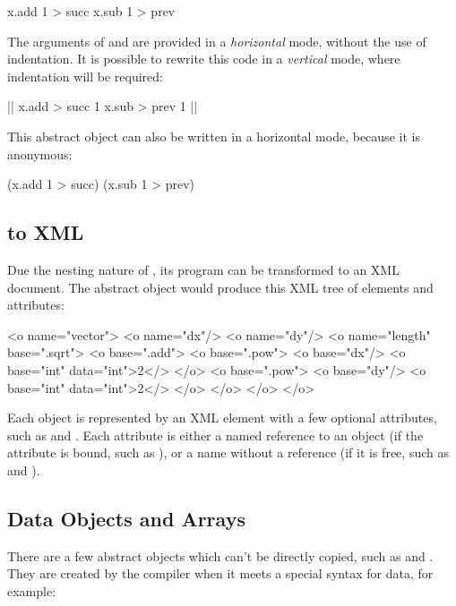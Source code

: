 \begin{ffcode}
[x]
  x.add 1 > succ
  x.sub 1 > prev
\end{ffcode}

The arguments of  and  are provided in a \emph{horizontal}
mode, without the use of indentation. It is possible to rewrite this code
in a \emph{vertical} mode, where indentation will be required:

\begin{ffcode}
[x] |$\label{ln:succ}$|
  x.add > succ
    1
  x.sub > prev
    1 |$\label{ln:succ-end}$|
\end{ffcode}

This abstract object can also be written in a horizontal mode,
because it is anonymous:

\begin{ffcode}
[x] (x.add 1 > succ) (x.sub 1 > prev)
\end{ffcode}

\subsection{\eo{} to XML}\label{sec:xml}

Due the nesting nature of \eo{}, its program can be transformed
to an XML document. The abstract object  would produce
this XML tree of elements and attributes:

\begin{ffcode}
<o name="vector">
  <o name="dx"/>
  <o name="dy"/>
  <o name="length" base=".sqrt">
    <o base=".add">
      <o base=".pow">
        <o base="dx"/>
        <o base="int" data="int">2</>
      </o>
      <o base=".pow">
        <o base="dy"/>
        <o base="int" data="int">2</>
      </o>
    </o>
  </o>
</o>
\end{ffcode}

Each object is represented by an  XML element with a few
optional attributes, such as  and . Each
attribute is either a named reference to an object (if the attribute is bound,
such as ), or a name without a reference (if it is free,
such as  and ).

\subsection{Data Objects and Arrays}

There are a few abstract objects which can't be directly copied, such as
 and . They are created by the compiler when it meets
a special syntax for data, for example:

